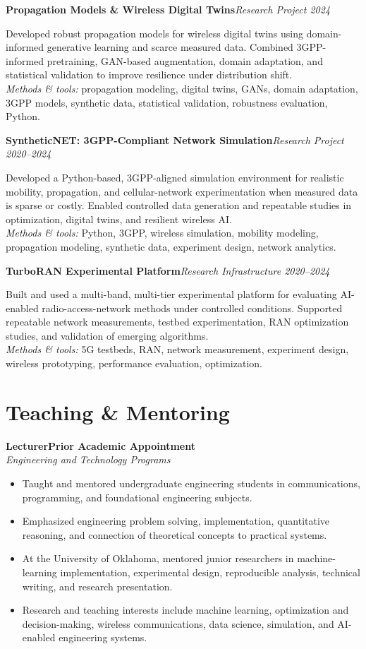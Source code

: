 \documentclass[9pt,letterpaper]{extarticle}
\newcommand{\role}[4]{\Needspace{4\baselineskip}\textbf{#1}\hfill\textbf{#2}\\[-1pt]\textit{#3}\hfill\textit{#4}\par}
\newcommand{\project}[3]{\Needspace{5\baselineskip}\textbf{#1}\hfill\textit{#2 \textbar{} #3}\par}
\begin{document}
\project{Propagation Models \& Wireless Digital Twins}{Research Project}{2024}
Developed robust propagation models for wireless digital twins using domain-informed generative learning and scarce measured data. Combined 3GPP-informed pretraining, GAN-based augmentation, domain adaptation, and statistical validation to improve resilience under distribution shift.\\[-1pt]
{\small\textit{Methods \& tools:} propagation modeling, digital twins, GANs, domain adaptation, 3GPP models, synthetic data, statistical validation, robustness evaluation, Python.}

\project{SyntheticNET: 3GPP-Compliant Network Simulation}{Research Project}{2020--2024}
Developed a Python-based, 3GPP-aligned simulation environment for realistic mobility, propagation, and cellular-network experimentation when measured data is sparse or costly. Enabled controlled data generation and repeatable studies in optimization, digital twins, and resilient wireless AI.\\[-1pt]
{\small\textit{Methods \& tools:} Python, 3GPP, wireless simulation, mobility modeling, propagation modeling, synthetic data, experiment design, network analytics.}

\project{TurboRAN Experimental Platform}{Research Infrastructure}{2020--2024}
Built and used a multi-band, multi-tier experimental platform for evaluating AI-enabled radio-access-network methods under controlled conditions. Supported repeatable network measurements, testbed experimentation, RAN optimization studies, and validation of emerging algorithms.\\[-1pt]
{\small\textit{Methods \& tools:} 5G testbeds, RAN, network measurement, experiment design, wireless prototyping, performance evaluation, optimization.}

\newpage
\section{Teaching \& Mentoring}
\role{Lecturer}{Prior Academic Appointment}{Engineering and Technology Programs}{}
\begin{itemize}
\item Taught and mentored undergraduate engineering students in communications, programming, and foundational engineering subjects.
\item Emphasized engineering problem solving, implementation, quantitative reasoning, and connection of theoretical concepts to practical systems.
\end{itemize}
\begin{itemize}
\item At the University of Oklahoma, mentored junior researchers in machine-learning implementation, experimental design, reproducible analysis, technical writing, and research presentation.
\item Research and teaching interests include machine learning, optimization and decision-making, wireless communications, data science, simulation, and AI-enabled engineering systems.
\end{itemize}
\end{document}
